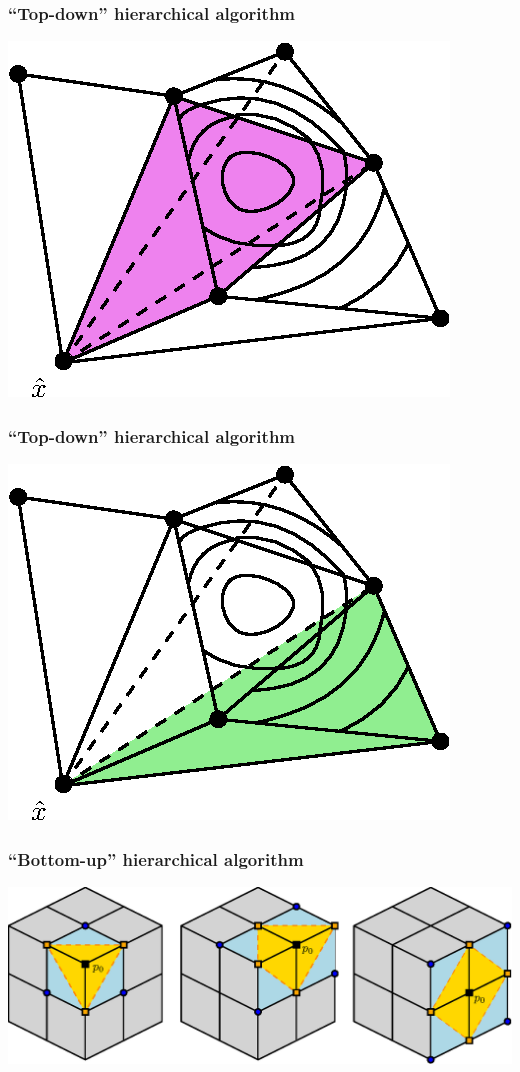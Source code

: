 \documentclass{beamer}
\begin{document}
\begin{frame}
  \frametitle{``Top-down'' hierarchical algorithm}
  \centering
  \includegraphics[width=0.75\linewidth]{top-down-algorithm-3.eps}
\end{frame}

\begin{frame}
  \frametitle{``Top-down'' hierarchical algorithm}
  \centering
  \includegraphics[width=0.75\linewidth]{top-down-algorithm-4.eps}
\end{frame}

\begin{frame}
  \frametitle{``Bottom-up'' hierarchical algorithm}
  \centering
  \vspace{1em}
  \includegraphics[width=\linewidth]{hu-neighborhoods.eps}
\end{frame}
\end{document}
